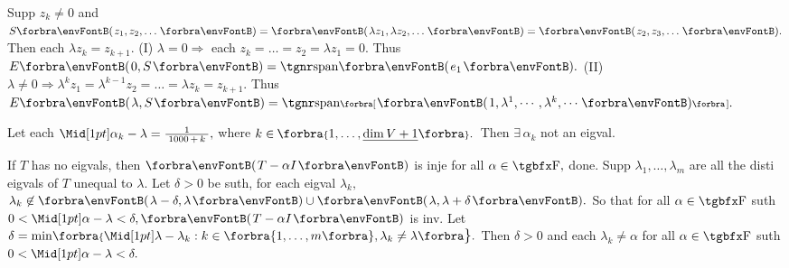 Supp $z_k\neq 0$ and $S\Par{z_1,z_2,\dots}=\Par{\lambda z_1,\lambda z_2,\dots}=\Par{z_2,z_3,\dots}.$ Then each $\lambda z_k=z_{k+1}.$\parSol{}
(I) $\lambda=0\Rightarrow$ each $z_k=\dots=z_2=\lambda z_1=0.$ \;Thus $E\Par{0,S}=\Span{e_1}.$\parSol{}
(II) $\lambda\neq 0\Rightarrow\lambda^k z_1=\lambda^{k-1} z_2=\dots=\lambda z_k=z_{k+1}.$ \;Thus $E\Par{\lambda,S}=\Span[\Sbra]{\Par{1,\lambda^1,\cdots,\lambda^k,\cdots}}.$\PfEnd
\SepLine



Let each $\aMid{\alpha_k-\lambda}=\frac{1}{\;1000\,+\,k\;},$ where $k\in\;\!\!\Bra{1,\dots,\uline{\dim V+1}}.$ \,Then $\exists\,\alpha_k$ not an eigval.\PfEnd
\SepLine[0pt][\Blind{\BulletPointX} ]

If $T$ has no eigvals, then $\Par{T-\alpha I}$ is inje for all $\alpha\in\Fbb,$ done.\parSol{}
Supp $\lambda_1,\dots,\lambda_m$ are all the disti eigvals of $T$ unequal to $\lambda.$\parSol{}
Let $\delta>0$ be suth, for each eigval $\lambda_k,$ $\lambda_k\not\in\Par{\lambda-\delta,\lambda}\cup \Par{\lambda,\lambda+\delta}.$\parSol{}
So that for all $\alpha\in\Fbb$ suth $0<\aMid{\alpha-\lambda}<\delta,\Par{T-\alpha I}$ is inv.\PfEnd\vspace{4pt}\parSol{}
\Or Let $\delta=\min\!\Bra{\aMid{\lambda-\lambda_k}:k\in\envFontSmall\Bra{1,\dots,m}\envFontDefault,\lambda_k\neq\lambda}.$\parSol{}
Then $\delta>0$ and each $\lambda_k\neq\alpha$  for all $\alpha\in\Fbb$ suth $0<\aMid{\alpha-\lambda}<\delta.$\PfEnd
\SepLine

